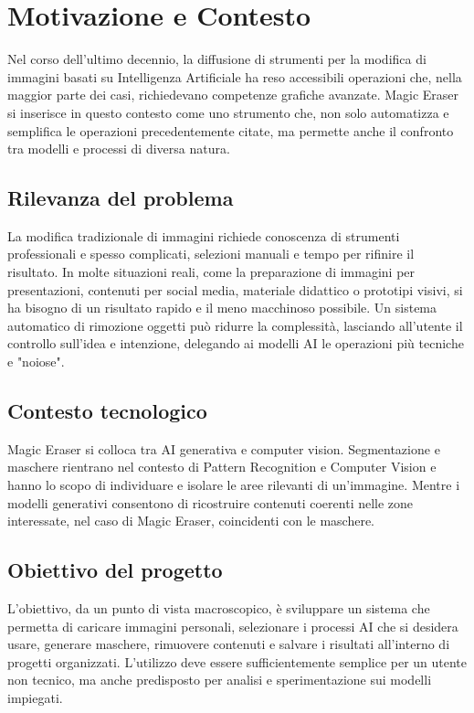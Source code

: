 \documentclass[oneside]{supsistudent}
\begin{document}
\newpage
\mainmatter
{}
\setcounter{page}{1}


\chapter{Motivazione e Contesto}

Nel corso dell'ultimo decennio, la diffusione di strumenti per la modifica di immagini basati su
Intelligenza Artificiale ha reso accessibili operazioni che, nella maggior parte dei casi,
richiedevano competenze grafiche avanzate. Magic Eraser si inserisce in questo contesto come uno strumento
che, non solo automatizza e semplifica le operazioni precedentemente citate, ma permette anche il
confronto tra modelli e processi di diversa natura.


\section{Rilevanza del problema}

La modifica tradizionale di immagini richiede conoscenza di strumenti
professionali e spesso complicati, selezioni manuali e tempo per rifinire
il risultato.
In molte situazioni reali, come la preparazione di immagini per presentazioni,
contenuti per social media,
materiale didattico o prototipi visivi, si ha bisogno di un risultato rapido e il meno macchinoso possibile.
Un sistema automatico di rimozione
oggetti può ridurre la complessità, lasciando
all'utente il controllo sull'idea e intenzione, delegando ai modelli AI le operazioni
più tecniche e "noiose".

\section{Contesto tecnologico}

Magic Eraser si colloca tra AI generativa e computer vision.
Segmentazione e maschere rientrano nel contesto di Pattern Recognition e Computer Vision
e hanno lo scopo di individuare e isolare le aree rilevanti di un'immagine.
Mentre i modelli generativi consentono di ricostruire contenuti coerenti nelle zone
interessate, nel caso di Magic Eraser, coincidenti con le maschere.

\section{Obiettivo del progetto}

L'obiettivo, da un punto di vista macroscopico, è sviluppare un sistema che permetta di
caricare immagini personali, selezionare i processi AI che si desidera usare, generare
maschere, rimuovere contenuti e salvare i risultati all'interno di progetti organizzati.
L'utilizzo deve essere sufficientemente semplice
per un utente non tecnico, ma anche predisposto per analisi
e sperimentazione sui modelli impiegati.
\end{document}
